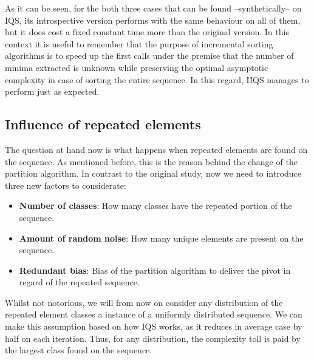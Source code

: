 As it can be seen, for the both three cases that can be found --synthetically-- on IQS, its introspective version performs with the same behaviour on all of them, but it does cost a fixed constant time more than the original version. In this context it is useful to remember that the purpose of incremental sorting algorithms is to speed up the first calls under the premise that the number of minima extracted is unknown while preserving the optimal asymptotic complexity in case of sorting the entire sequence. In this regard, IIQS manages to perform just as expected.

\subsection{Influence of repeated elements}

The question at hand now is what happens when repeated elements are found on the sequence. As mentioned before, this is the reason behind the change of the partition algorithm. In contrast to the original study, now we need to introduce three new factors to considerate:

\begin{itemize}
    \item \textbf{Number of classes}: How many classes have the repeated portion of the sequence.
    \item \textbf{Amount of random noise}: How many unique elements are present on the sequence.
    \item \textbf{Redundant bias}: Bias of the partition algorithm to deliver the pivot in regard of the repeated sequence.
\end{itemize}

Whilst not notorious, we will from now on consider any distribution of the repeated element classes a instance of a uniformly distributed sequence. We can make this assumption based on how IQS works, as it reduces in average case by half on each iteration. Thus, for any distribution, the complexity toll is paid by the largest class found on the sequence.

